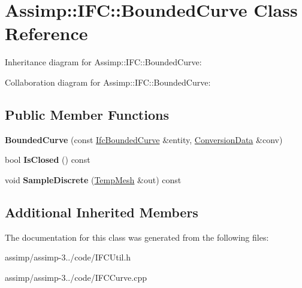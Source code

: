 \hypertarget{class_assimp_1_1_i_f_c_1_1_bounded_curve}{\section{Assimp\+:\+:I\+F\+C\+:\+:Bounded\+Curve Class Reference}
\label{class_assimp_1_1_i_f_c_1_1_bounded_curve}
}


Inheritance diagram for Assimp\+:\+:I\+F\+C\+:\+:Bounded\+Curve\+:


Collaboration diagram for Assimp\+:\+:I\+F\+C\+:\+:Bounded\+Curve\+:
\subsection*{Public Member Functions}
\begin{DoxyCompactItemize}
\item 
\hypertarget{class_assimp_1_1_i_f_c_1_1_bounded_curve_af018aa422f9345af2ff7114f2e34d262}{{\bfseries Bounded\+Curve} (const \hyperlink{struct_assimp_1_1_i_f_c_1_1_ifc_bounded_curve}{Ifc\+Bounded\+Curve} \&entity, \hyperlink{struct_assimp_1_1_i_f_c_1_1_conversion_data}{Conversion\+Data} \&conv)}\label{class_assimp_1_1_i_f_c_1_1_bounded_curve_af018aa422f9345af2ff7114f2e34d262}

\item 
\hypertarget{class_assimp_1_1_i_f_c_1_1_bounded_curve_a04f1bbe480fdc5c52871dae851657c2a}{bool {\bfseries Is\+Closed} () const }\label{class_assimp_1_1_i_f_c_1_1_bounded_curve_a04f1bbe480fdc5c52871dae851657c2a}

\item 
\hypertarget{class_assimp_1_1_i_f_c_1_1_bounded_curve_a7f50428516e5b21d3f01a01fe886b8e5}{void {\bfseries Sample\+Discrete} (\hyperlink{struct_assimp_1_1_i_f_c_1_1_temp_mesh}{Temp\+Mesh} \&out) const }\label{class_assimp_1_1_i_f_c_1_1_bounded_curve_a7f50428516e5b21d3f01a01fe886b8e5}

\end{DoxyCompactItemize}
\subsection*{Additional Inherited Members}


The documentation for this class was generated from the following files\+:\begin{DoxyCompactItemize}
\item 
assimp/assimp-\/3../code/I\+F\+C\+Util.\+h\item 
assimp/assimp-\/3../code/I\+F\+C\+Curve.\+cpp\end{DoxyCompactItemize}
